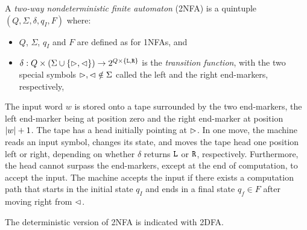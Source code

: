 \begin{defn}
	A \emph{two-way nondeterministic finite automaton} (2NFA) is a quintuple $(Q,\Sigma,\delta,q_I,F)$ where:
	\begin{itemize}
		\item $Q$, $\Sigma$, $q_I$ and $F$ are defined as for 1NFAs, and
		\item $\delta:Q\times(\Sigma\cup\{\rhd,\lhd\})\to2^{Q\times\{\mathtt L,\mathtt R\}}$ is the \emph{transition function}, with the two special symbols $\rhd,\lhd\notin\Sigma$ called the left and the right end-markers, respectively,
	\end{itemize}
	The input word $w$ is stored onto a tape surrounded by the two end-markers, the left end-marker being at position zero and the right end-marker at position $\lvert w \rvert+1$.
	The tape has a head initially pointing at $\rhd$.
	In one move, the machine reads an input symbol, changes its state, and moves the tape head one position left or right, depending on whether $\delta$ returns $\mathtt L$ or $\mathtt R$, respectively.
	Furthermore, the head cannot surpass the end-markers, except at the end of computation, to accept the input.
	The machine accepts the input if there exists a computation path that starts in the initial state $q_I$ and ends in a final state $q_f\in F$ after moving right from $\lhd$.

	The deterministic version of 2NFA is indicated with 2DFA.
\end{defn}





